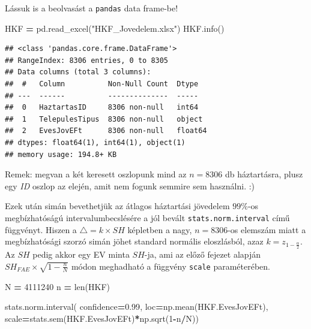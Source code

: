 \documentclass[
]{book}
\newenvironment{Shaded}{\begin{snugshade}}{\end{snugshade}}
\newcommand{\BuiltInTok}[1]{#1}
\newcommand{\DecValTok}[1]{\textcolor[rgb]{0.00,0.00,0.81}{#1}}
\newcommand{\FloatTok}[1]{\textcolor[rgb]{0.00,0.00,0.81}{#1}}
\newcommand{\NormalTok}[1]{#1}
\newcommand{\OperatorTok}[1]{\textcolor[rgb]{0.81,0.36,0.00}{\textbf{#1}}}
\newcommand{\StringTok}[1]{\textcolor[rgb]{0.31,0.60,0.02}{#1}}
\begin{document}
Lássuk is a beolvasást a \texttt{pandas} data frame-be!

\begin{Shaded}
\begin{Highlighting}[]
\NormalTok{HKF }\OperatorTok{=}\NormalTok{ pd.read\_excel(}\StringTok{"HKF\_Jovedelem.xlsx"}\NormalTok{)}
\NormalTok{HKF.info()}
\end{Highlighting}
\end{Shaded}

\begin{verbatim}
## <class 'pandas.core.frame.DataFrame'>
## RangeIndex: 8306 entries, 0 to 8305
## Data columns (total 3 columns):
##  #   Column          Non-Null Count  Dtype  
## ---  ------          --------------  -----  
##  0   HaztartasID     8306 non-null   int64  
##  1   TelepulesTipus  8306 non-null   object 
##  2   EvesJovEFt      8306 non-null   float64
## dtypes: float64(1), int64(1), object(1)
## memory usage: 194.8+ KB
\end{verbatim}

Remek: megvan a két keresett oszlopunk mind az \(n=8306\) db háztartásra, plusz egy \emph{ID} oszlop az elején, amit nem fogunk semmire sem használni. :)

Ezek után simán bevethetjük az átlagos háztartási jövedelem \(99\%\)-os megbízhatóságú intervalumbecslésére a jól bevált \texttt{stats.norm.interval} című függvényt. Hiszen a \(\triangle=k \times SH\) képletben a nagy, \(n=8306\)-os elemszám miatt a megbízhatósági szorzó simán jöhet standard normális eloszlásból, azaz \(k=z_{1-\frac{\alpha}{2}}\). Az \(SH\) pedig akkor egy EV minta \(SH\)-ja, ami az előző fejezet alapján \(SH_{FAE} \times \sqrt{1-\frac{n}{N}}\) módon meghadható a függvény \texttt{scale} paraméterében.

\begin{Shaded}
\begin{Highlighting}[]
\NormalTok{N }\OperatorTok{=} \DecValTok{4111240}
\NormalTok{n }\OperatorTok{=} \BuiltInTok{len}\NormalTok{(HKF)}

\NormalTok{stats.norm.interval(}
\NormalTok{  confidence}\OperatorTok{=}\FloatTok{0.99}\NormalTok{,}
\NormalTok{  loc}\OperatorTok{=}\NormalTok{np.mean(HKF.EvesJovEFt),}
\NormalTok{  scale}\OperatorTok{=}\NormalTok{stats.sem(HKF.EvesJovEFt)}\OperatorTok{*}\NormalTok{np.sqrt(}\DecValTok{1}\OperatorTok{{-}}\NormalTok{n}\OperatorTok{/}\NormalTok{N))}
\end{Highlighting}
\end{Shaded}
\end{document}
